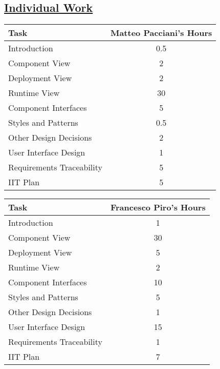 \subsection[Individual Work]{\hyperlink{toc}{Individual Work}}
\vspace{2mm}
\begin{center}
	\begin{tabular}{| l | c |}
	\hline
	\textbf{Task} & \textbf{Matteo Pacciani's Hours} \\ \hline
	Introduction & 0.5 \\ \hline
	Component View & 2 \\ \hline
	Deployment View & 2 \\ \hline
	Runtime View & 30 \\ \hline
	Component Interfaces & 5 \\ \hline
	Styles and Patterns & 0.5 \\ \hline
	Other Design Decisions & 2 \\ \hline
	User Interface Design & 1 \\ \hline
	Requirements Traceability & 5 \\ \hline
	IIT Plan & 5 \\
	\hline	
	\end{tabular}
	
	\vspace{2mm}
	
	\begin{tabular}{| l | c |}
	\hline
	\textbf{Task} & \textbf{Francesco Piro's Hours} \\ \hline
	Introduction & 1 \\ \hline
	Component View & 30 \\ \hline
	Deployment View & 5 \\ \hline
	Runtime View & 2 \\ \hline
	Component Interfaces & 10 \\ \hline
	Styles and Patterns & 5 \\ \hline
	Other Design Decisions & 1 \\ \hline
	User Interface Design & 15 \\ \hline
	Requirements Traceability & 1 \\ \hline
	IIT Plan & 7 \\
	\hline
	\end{tabular}
\end{center}